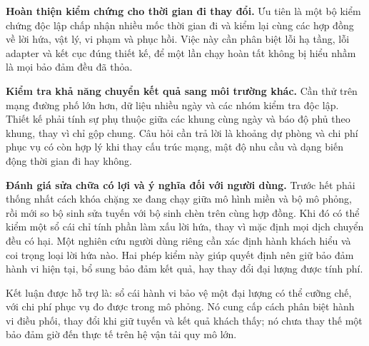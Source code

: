 \textbf{Hoàn thiện kiểm chứng cho thời gian đi thay đổi.} Ưu tiên là một bộ kiểm
chứng độc lập chấp nhận nhiều mốc thời gian đi và kiểm lại cùng các hợp đồng về
lời hứa, vật lý, vi phạm và phục hồi. Việc này cần phân biệt lỗi hạ tầng, lỗi
adapter và kết cục đúng thiết kế, để một lần chạy hoàn tất không bị hiểu nhầm là
mọi bảo đảm đều đã thỏa.

\textbf{Kiểm tra khả năng chuyển kết quả sang môi trường khác.} Cần thử trên mạng
đường phố lớn hơn, dữ liệu nhiều ngày và các nhóm kiểm tra độc lập. Thiết kế phải
tính sự phụ thuộc giữa các khung cùng ngày và báo độ phủ theo khung, thay vì chỉ
gộp chung. Câu hỏi cần trả lời là khoảng dự phòng và chi phí phục vụ có còn hợp lý
khi thay cấu trúc mạng, mật độ nhu cầu và dạng biến động thời gian đi hay không.

\textbf{Đánh giá sửa chữa có lợi và ý nghĩa đối với người dùng.} Trước hết phải
thống nhất cách khóa chặng xe đang chạy giữa mô hình miền và bộ mô phỏng, rồi mới
so bộ sinh sửa tuyến với bộ sinh chèn trên cùng hợp đồng. Khi đó có thể kiểm một
sổ cái chỉ tính phần làm xấu lời hứa, thay vì mặc định mọi dịch chuyển đều có hại.
Một nghiên cứu người dùng riêng cần xác định hành khách hiểu và coi trọng loại
lời hứa nào. Hai phép kiểm này giúp quyết định nên giữ bảo đảm hành vi hiện tại,
bổ sung bảo đảm kết quả, hay thay đổi đại lượng được tính phí.

Kết luận được hỗ trợ là: sổ cái hành vi bảo vệ một đại lượng có thể cưỡng chế,
với chi phí phục vụ đo được trong mô phỏng. Nó cung cấp cách phân biệt hành vi
điều phối, thay đổi khi giữ tuyến và kết quả khách thấy; nó chưa thay thế một
bảo đảm giờ đến thực tế trên hệ vận tải quy mô lớn.
